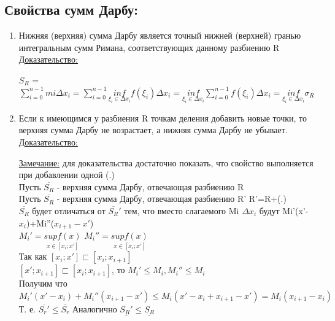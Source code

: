 \documentclass[12pt]{article}
\begin{document}
    \subsection*{Свойства сумм Дарбу:}
    \begin{enumerate}
        \item Нижняя (верхняя) сумма Дарбу является точный нижней (верхней) гранью интегральным сумм
        Римана, соответствующих данному разбиению R
        \underline{Доказательство:}
        \begin{adjustwidth}{1.5em}{1.5em}
            \underline{$S_R$} = $\sum_{i=0}^{n-1} mi \Delta x_i = \sum_{i=0}^{n-1}
            \underset{\xi_i \in \Delta x_i}{inf} f(\xi_i) \Delta x_i = \underset{\xi_i \in \Delta x_i}{inf}
            \sum_{i=0}^{n-1} f(\xi_i) \Delta x_i = \underset{\xi_i \in \Delta x_i}{inf} \sigma_R$
        \end{adjustwidth}
        \item Если к имеющимся у разбиения R точкам деления добавить новые точки, то верхняя сумма Дарбу
        не возрастает, а нижняя сумма Дарбу не убывает.\\
        \underline{Доказательство:}
        \begin{adjustwidth}{1.5em}{1.5em}
            \underline{Замечание:} для доказательства достаточно показать, что свойство выполняется при 
            добавлении одной (.)\\
            Пусть $\overline{S_R}$ - верхняя сумма Дарбу, отвечающая разбиению R\\
            Пусть $\overline{S_R}$ - верхняя сумма Дарбу, отвечающая разбиению R' R'=R+(.)\\
            $\overline{S_R}$ будет отличаться от $\overline{S_R}'$ тем, что вместо слагаемого Mi
            $\Delta x_i$ будут Mi'(x'-$x_i$)+Mi''($x_{i+1}-x'$)\\
            $M_i' = \underset{x \in [x_i;x']}{sup f(x)}$  $M_i''= \underset{x \in [x_i;x']}{sup f(x)}$\\
            Так как $[x_i;x'] \sqsubset [x_i;x_{i+1}]$\\
            $[x';x_{i+1}] \sqsubset [x_i;x_{i+1}]$, то $M_i' \leq M_i, M_i''\leq M_i$\\
            Получим что $M_i'(x'-x_i)+M_i''(x_{i+1}-x') \leq M_i(x'-x_i+x_{i+1}-x') = M_i(x_{i+1}-x_i)$\\
            Т. е. $\overline{S_r'} \leq \overline{S_r}$ Аналогично $\underline{S_R'} \leq \underline{S_R}$\\
            \begin{center}

\end{center}
\end{adjustwidth}
\end{enumerate}
\end{document}
